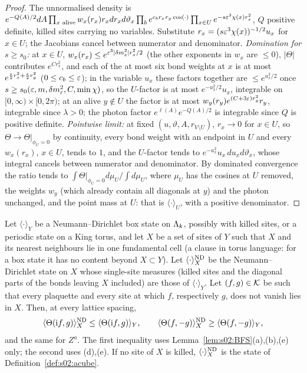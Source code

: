 \begin{proof}
The unnormalised density is $e^{-Q(A)/2}dA\prod_{x\text{ alive}}w_x(r_x)r_xdr_xd\vartheta_x\prod_{b}e^{c_br_xr_y\cos(\cdot)}\prod_{x\in U}e^{-s\varepsilon^3\chi(x)r_x^2}$, $Q$ positive definite, killed sites carrying no variables. Substitute $r_x=(s\varepsilon^3\chi(x))^{-1/2}u_x$ for $x\in U$; the Jacobians cancel between numerator and denominator. \emph{Domination for $s\ge s_0$:} at $x\in U$, $w_x(r_x)\le e^{\varepsilon^3|\delta m^2_{\varepsilon}|r_x^2/2}$ (the other exponents in $w_x$ are $\le0$), $|\Theta|$ contributes $e^{Cr_x^2}$, and each of the at most six bond weights at $x$ is at most $e^{\frac{\varepsilon}2r_x^2+\frac{\varepsilon}2r_y^2}$ ($0\le c_b\le\varepsilon$); in the variable $u_x$ these factors together are $\le e^{u_x^2/2}$ once $s\ge s_0(\varepsilon,m,\delta m^2_{\varepsilon},C,\min\chi)$, so the $U$-factor is at most $e^{-u_x^2/2}u_x$, integrable on $[0,\infty)\times[0,2\pi)$; at an alive $y\notin U$ the factor is at most $w_y(r_y)e^{(C+3\varepsilon)r_y^2}r_y$, integrable since $\lambda>0$; the photon factor $e^{\ell(A)}e^{-Q(A)/2}$ is integrable since $Q$ is positive definite. \emph{Pointwise limit:} at fixed $(u,\vartheta,A,r_{V\setminus U})$, $r_x\to0$ for $x\in U$, so $\Theta\to\Theta|_{\phi_U=0}$ by continuity, every bond weight with an endpoint in $U$ and every $w_x(r_x)$, $x\in U$, tends to $1$, and the $U$-factor tends to $e^{-u_x^2}u_x\,du_xd\vartheta_x$, whose integral cancels between numerator and denominator. By dominated convergence the ratio tends to $\int\Theta|_{\phi_U=0}d\mu_U/\int d\mu_U$, where $\mu_U$ has the cosines at $U$ removed, the weights $w_y$ (which already contain all diagonals at $y$) and the photon unchanged, and the point mass at $U$: that is $\langle\cdot\rangle_U$, with a positive denominator.
\end{proof}

\begin{lemma}[cutting]\label{lem:s02:cut}
Let $\langle\cdot\rangle_Y$ be a Neumann--Dirichlet box state on $\Lambda_k$, possibly with killed sites, or a periodic state on a King torus, and let $X$ be a set of sites of $Y$ such that $X$ and its nearest neighbours lie in one fundamental cell (a clause in torus language: for a box state it has no content beyond $X\subset Y$). Let $\langle\cdot\rangle^{\mathrm{ND}}_X$ be the Neumann--Dirichlet state on $X$ whose single-site measures (killed sites and the diagonal parts of the bonds leaving $X$ included) are those of $\langle\cdot\rangle_Y$. Let $(f,g)\in\mathcal K$ be such that every plaquette and every site at which $f$, respectively $g$, does not vanish lies in $X$. Then, at every lattice spacing,
\[
\langle\Theta(\mathrm if,g)\rangle^{\mathrm{ND}}_X\le\langle\Theta(\mathrm if,g)\rangle_Y,\qquad
\langle\Theta(f,-g)\rangle^{\mathrm{ND}}_X\ge\langle\Theta(f,-g)\rangle_Y,
\]
and the same for $Z^a$. The first inequality uses Lemma~\ref{lem:s02:BFS}(a),(b),(e) only; the second uses (d),(e). If no site of $X$ is killed, $\langle\cdot\rangle^{\mathrm{ND}}_X$ is the state of Definition~\ref{def:s02:acube}.
\end{lemma}

